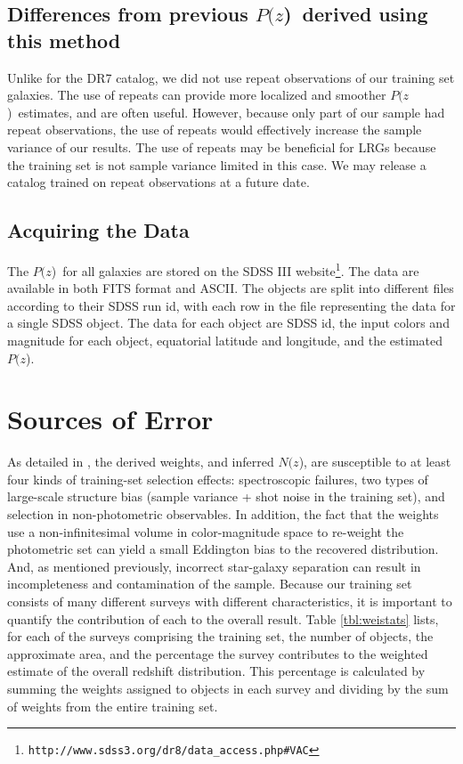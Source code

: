 \documentclass[preprint]{aastex}
\newcommand{\pofz}{$P(z$)}
\newcommand{\nofz}{$N(z$)}
\newcommand{\downloadURL}{{\tt http://www.sdss3.org/dr8/data\_access.php\#VAC}}
\begin{document}
\subsection{Differences from previous \pofz\ derived using this method}

Unlike for the DR7 catalog, we
did not use repeat observations of our training set galaxies.  The use of
repeats can provide more localized and smoother \pofz\ estimates, and are often
useful.  However, because only part of our sample had repeat observations, the
use of repeats would effectively increase the sample variance of our results.
The use of repeats may be beneficial for LRGs because the training set is not
sample variance limited in this case.  We may release a catalog trained on
repeat observations at a future date.  

\subsection{Acquiring the Data} \label{sec:get}

The \pofz\ for all galaxies are stored on the SDSS III
website\footnote{\downloadURL}.  The data are available in both FITS format and
ASCII.  The objects are split into different files according to their SDSS run
id, with each row in the file representing the data for a single SDSS object.
The data for each object are SDSS id, the input colors and magnitude for each
object, equatorial latitude and longitude, and the estimated \pofz.



\section{Sources of Error} \label{sec:errors}

As detailed in \cite{CunhaPhotoz09}, the derived weights, and inferred \nofz,
are susceptible to at least four kinds of training-set selection effects:
spectroscopic failures, two types of large-scale structure bias (sample variance + shot
noise in the training set), and selection in non-photometric observables.  In
addition, the fact that the weights use a non-infinitesimal volume in color-magnitude
space to re-weight the photometric set can yield a small Eddington bias to the
recovered distribution.  And, as mentioned previously, incorrect star-galaxy
separation can result in incompleteness and contamination of the sample.
Because our training set consists of many different surveys with different
characteristics, it is important to quantify the contribution of each to the
overall result.  Table \ref{tbl:weistats} lists, for each of the surveys
comprising the training set, the number of objects, the approximate area, and
the percentage the survey contributes to the weighted estimate of the overall
redshift distribution.  This percentage is calculated by summing the weights
assigned to objects in each survey and dividing by the sum of weights from the
entire training set.
\end{document}

